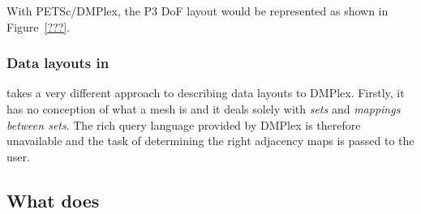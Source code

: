 \documentclass[thesis]{subfiles}
\begin{document}
With PETSc/DMPlex, the P3 DoF layout would be represented as shown in Figure~\ref{???}.

\subsubsection{Data layouts in }

 takes a very different approach to describing data layouts to DMPlex.
Firstly, it has no conception of what a mesh is and it deals solely with \textit{sets} and \textit{mappings between sets}.
The rich query language provided by DMPlex is therefore unavailable and the task of determining the right adjacency maps is passed to the user.

\subsection{What  does}



\end{document}
